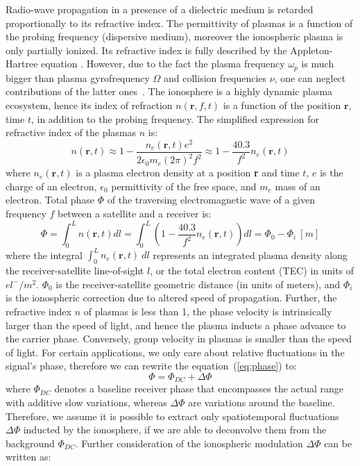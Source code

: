 \documentclass[letterpaper,12pt]{article}
\begin{document}
Radio-wave propagation in a presence of a dielectric medium is retarded proportionally to its refractive index. The permittivity of plasmas is a function of the probing frequency (dispersive medium), moreover the ionospheric plasma is only partially ionized. Its refractive index is fully described by the Appleton-Hartree equation \citep{Appleton1932}. However, due to the fact the plasma frequency $\omega_p$ is much bigger than plasma gyrofrequency $\Omega$ and collision frequencies $\nu$, one can neglect contributions of the latter ones~\citep[cf.][]{Kashcheyev2012}. The ionosphere is a highly dynamic plasma ecosystem, hence its index of refraction $n(\textbf{r},f,t)$ is a function of the position $\textbf{r}$, time $t$, in addition to the probing frequency. The simplified expression for refractive index of the plasmas $n$ is:
\begin{equation}
n(\textbf{r},t) \approx 1 - \frac{n_e(\textbf{r},t) e^2}{2 \epsilon_0 m_e (2\pi)^2 f^2} \approx 1- \frac{40.3}{f^2} n_e(\textbf{r},t)
\end{equation}
where $n_e(\textbf{r},t)$ is a plasma electron density at a position \textbf{r} and time $t$, $e$ is the charge of an electron, $\epsilon_0$ permittivity of the free space, and $m_e$ mass of an electron. Total phase $\Phi$ of the traversing electromagnetic wave of a given frequency $f$ between a satellite and a receiver is:
\begin{equation}
\Phi = \int_0^L n(\textbf{r},t) dl = \int_0^L \left(1 - \frac{40.3}{f^2} n_e(\textbf{r},t)\right) dl = \Phi_0 - \Phi_i ~ [m]
\label{eq:phase}
\end{equation}
where the integral $\int_0^L n_e(\textbf{r},t)~dl$ represents an integrated plasma density along the receiver-satellite line-of-sight $l$, or the total electron content (TEC) in units of $el^-/m^2$. $\Phi_0$ is the receiver-satellite geometric distance (in units of meters), and $\Phi_i$ is the ionospheric correction due to altered speed of propagation. Further, the refractive index $n$ of plasmas is less than 1, the phase velocity is intrinsically larger than the speed of light, and hence the plasma inducts a phase advance to the carrier phase. Conversely, group velocity in plasmas is smaller than the speed of light. For certain applications, we only care about relative fluctuations in the signal's phase, therefore we can rewrite the equation~(\ref{eq:phase}) to:
\begin{equation}
\Phi = \Phi_{DC} + \Delta\Phi
\end{equation}
where $\Phi_{DC}$ denotes a baseline receiver phase that encompasses the actual range with additive slow variations, whereas $\Delta\Phi$ are variations around the baseline. Therefore, we assume it is possible to extract only spatiotemporal fluctuations $\Delta\Phi$ inducted by the ionosphere, if we are able to deconvolve them from the background $\Phi_{DC}$. Further consideration of the ionospheric modulation $\Delta\Phi$ can be written as:
\end{document}
